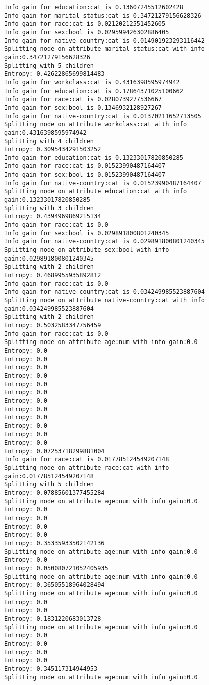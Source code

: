 \documentclass[a4paper,11pt,titlepage]{article}
\begin{document}
\begin{verbatim}
Info gain for education:cat is 0.13607245512602428
Info gain for marital-status:cat is 0.34721279156628326
Info gain for race:cat is 0.02120212551452605
Info gain for sex:bool is 0.029599426302886405
Info gain for native-country:cat is 0.014901923293116442
Splitting node on attribute marital-status:cat with info gain:0.34721279156628326
Splitting with 5 children
Entropy: 0.42622865699814483
Info gain for workclass:cat is 0.4316398595974942
Info gain for education:cat is 0.17864371025100662
Info gain for race:cat is 0.0280739277536667
Info gain for sex:bool is 0.1346932128927267
Info gain for native-country:cat is 0.01370211652713505
Splitting node on attribute workclass:cat with info gain:0.4316398595974942
Splitting with 4 children
Entropy: 0.3095434291503252
Info gain for education:cat is 0.13233017820850285
Info gain for race:cat is 0.01523990487164407
Info gain for sex:bool is 0.01523990487164407
Info gain for native-country:cat is 0.01523990487164407
Splitting node on attribute education:cat with info gain:0.13233017820850285
Splitting with 3 children
Entropy: 0.4394969869215134
Info gain for race:cat is 0.0
Info gain for sex:bool is 0.029891800801240345
Info gain for native-country:cat is 0.029891800801240345
Splitting node on attribute sex:bool with info gain:0.029891800801240345
Splitting with 2 children
Entropy: 0.4689955935892812
Info gain for race:cat is 0.0
Info gain for native-country:cat is 0.034249985523887604
Splitting node on attribute native-country:cat with info gain:0.034249985523887604
Splitting with 2 children
Entropy: 0.5032583347756459
Info gain for race:cat is 0.0
Splitting node on attribute age:num with info gain:0.0
Entropy: 0.0
Entropy: 0.0
Entropy: 0.0
Entropy: 0.0
Entropy: 0.0
Entropy: 0.0
Entropy: 0.0
Entropy: 0.0
Entropy: 0.0
Entropy: 0.0
Entropy: 0.0
Entropy: 0.0
Entropy: 0.07253718299881004
Info gain for race:cat is 0.017785124549207148
Splitting node on attribute race:cat with info gain:0.017785124549207148
Splitting with 5 children
Entropy: 0.07885601377455284
Splitting node on attribute age:num with info gain:0.0
Entropy: 0.0
Entropy: 0.0
Entropy: 0.0
Entropy: 0.0
Entropy: 0.35335933502142136
Splitting node on attribute age:num with info gain:0.0
Entropy: 0.0
Entropy: 0.050080721052405935
Splitting node on attribute age:num with info gain:0.0
Entropy: 0.36505518964028494
Splitting node on attribute age:num with info gain:0.0
Entropy: 0.0
Entropy: 0.0
Entropy: 0.1831220683013728
Splitting node on attribute age:num with info gain:0.0
Entropy: 0.0
Entropy: 0.0
Entropy: 0.0
Entropy: 0.0
Entropy: 0.345117314944953
Splitting node on attribute age:num with info gain:0.0

\end{verbatim}
\end{document}
